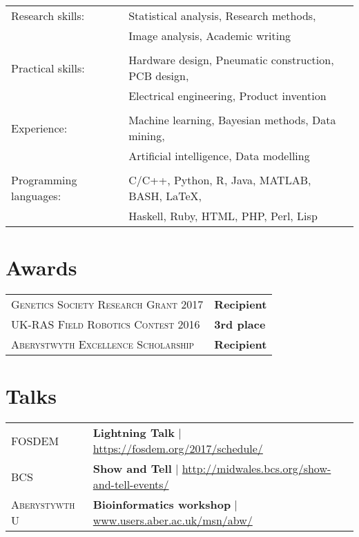 \documentclass[a4paper,10pt]{article}
\begin{document}
\begin{tabular}{ll}


  Research skills: & Statistical analysis, Research methods,\\& Image analysis, Academic writing

  \\

  \\

  Practical skills: & Hardware design, Pneumatic construction, PCB design, \\& Electrical engineering,  Product invention

    \\

  \\

  Experience: & Machine learning, Bayesian methods, Data mining, \\& Artificial intelligence, Data modelling

  \\

  \\


  Programming languages: & C/C++, Python, R, Java, MATLAB, BASH, \LaTeX,\\& Haskell, Ruby, HTML, PHP, Perl, Lisp


\end{tabular}


\section{Awards}
\begin{tabular}{ll}
  \textsc{Genetics Society Research Grant 2017}& \textbf{Recipient}
  \\
  \textsc{UK-RAS Field Robotics Contest 2016}& \textbf{3rd place}
  \\
  \textsc{Aberystwyth Excellence Scholarship}& \textbf{Recipient}
\end{tabular}


\section{Talks}
\begin{tabular}{ll}

  \textsc{FOSDEM} & \textbf{Lightning Talk} | \href{https://fosdem.org/2017/schedule/}{https://fosdem.org/2017/schedule/} \\
  \textsc{BCS} & \textbf{Show and Tell} | \href{http://www.midwales.bcs.org/show-and-tell-events/}{http://midwales.bcs.org/show-and-tell-events/}\\
  \textsc{Aberystywth U} & \textbf{Bioinformatics workshop} | \href{www.users.aber.ac.uk/msn/abw/index.html}{www.users.aber.ac.uk/msn/abw/}

\end{tabular}
\end{document}
